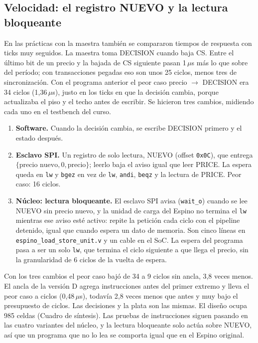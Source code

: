 \documentclass[11pt,letterpaper]{article}
\begin{document}
\subsection{Velocidad: el registro NUEVO y la lectura bloqueante}
\label{sec:velocidad}

En las prácticas con la maestra también se compararon tiempos de respuesta con ticks muy seguidos. La
maestra toma DECISION cuando baja CS. Entre el último bit de un precio y la bajada de CS siguiente
pasan 1\,$\mu$s más lo que sobre del período; con transacciones pegadas eso son unos 25 ciclos, menos
tres de sincronización. Con el programa anterior el peor caso precio $\to$ DECISION era 34 ciclos
(1,36\,$\mu$s), justo en los ticks en que la decisión cambia, porque actualizaba el piso y el techo antes
de escribir. Se hicieron tres cambios, midiendo cada uno en el testbench del curso.

\begin{enumerate}
\item \textbf{Software.} Cuando la decisión cambia, se escribe DECISION primero y el estado después.
\item \textbf{Esclavo SPI.} Un registro de solo lectura, NUEVO (offset \texttt{0x0C}), que entrega
$\{\text{precio nuevo}, 0, \text{precio}\}$; leerlo baja el aviso igual que leer PRICE. La espera queda en
\texttt{lw} y \texttt{bgez} en vez de \texttt{lw}, \texttt{andi}, \texttt{beqz} y la lectura de PRICE.
Peor caso: 16 ciclos.
\item \textbf{Núcleo: lectura bloqueante.} El esclavo SPI avisa (\texttt{wait\_o}) cuando se lee NUEVO
sin precio nuevo, y la unidad de carga del Espino no termina el \texttt{lw} mientras ese aviso esté
activo: repite la petición cada ciclo con el pipeline detenido, igual que cuando espera un dato de
memoria. Son cinco líneas en \texttt{espino\_load\_store\_unit.v} y un cable en el SoC. La espera
del programa pasa a ser un solo \texttt{lw}, que termina el ciclo siguiente a que llega el precio, sin
la granularidad de 6 ciclos de la vuelta de espera.
\end{enumerate}

Con los tres cambios el peor caso bajó de 34 a 9 ciclos sin ancla, 3,8 veces menos. El ancla de la
versión D agrega instrucciones antes del primer extremo y lleva el peor caso a \TbExtPeor{} ciclos
(0,48\,$\mu$s), todavía 2,8 veces menos que antes y muy bajo el presupuesto de \Presupuesto{} ciclos.
Las decisiones y la plata son las mismas. El diseño ocupa 985 celdas (Cuadro de síntesis). Las pruebas de instrucciones
siguen pasando en las cuatro variantes del núcleo, y la lectura bloqueante solo actúa sobre NUEVO, así
que un programa que no lo lea se comporta igual que en el Espino original.
\end{document}
